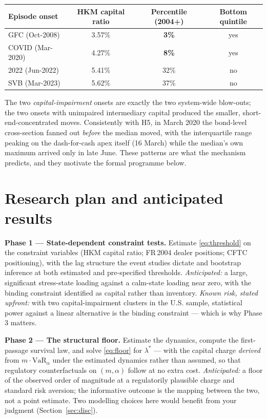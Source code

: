 \documentclass[11pt]{article}
\newcommand{\VaR}{\mathrm{VaR}}
\begin{document}
\begin{center}\small
\begin{tabular}{lccc}
\toprule
Episode onset & HKM capital ratio & Percentile (2004+) & Bottom quintile \\
\midrule
GFC (Oct-2008) & 3.57\% & \textbf{3\%} & yes \\
COVID (Mar-2020) & 4.27\% & \textbf{8\%} & yes \\
2022 (Jun-2022) & 5.41\% & 32\% & no \\
SVB (Mar-2023) & 5.62\% & 37\% & no \\
\bottomrule
\end{tabular}
\end{center}

The two \emph{capital-impairment} onsets are exactly the two system-wide blow-outs; the two onsets with unimpaired intermediary capital produced the smaller, short-end-concentrated moves. Consistently with H5, in March 2020 the bond-level cross-section fanned out \emph{before} the median moved, with the interquartile range peaking on the dash-for-cash apex itself (16 March) while the median's own maximum arrived only in late June. These patterns are what the mechanism predicts, and they motivate the formal programme below.

\section{Research plan and anticipated results}

\textbf{Phase 1 --- State-dependent constraint tests.} Estimate \eqref{eq:threshold} on the constraint variables (HKM capital ratio; FR\,2004 dealer positions; CFTC positioning), with the lag structure the event studies dictate and bootstrap inference at both estimated and pre-specified thresholds. \emph{Anticipated:} a large, significant stress-state loading against a calm-state loading near zero, with the binding constraint identified as capital rather than inventory. \emph{Known risk, stated upfront:} with two capital-impairment clusters in the U.S. sample, statistical power against a linear alternative is the binding constraint --- which is why Phase 3 matters.

\textbf{Phase 2 --- The structural floor.} Estimate the dynamics, compute the first-passage survival law, and solve \eqref{eq:floor} for $\lambda^\ast$ --- with the capital charge \emph{derived} from $m\cdot\VaR_\alpha$ under the estimated dynamics rather than assumed, so that regulatory counterfactuals on $(m,\alpha)$ follow at no extra cost. \emph{Anticipated:} a floor of the observed order of magnitude at a regulatorily plausible charge and standard risk aversion; the informative outcome is the mapping between the two, not a point estimate. Two modelling choices here would benefit from your judgment (Section~\ref{sec:disc}).
\end{document}
